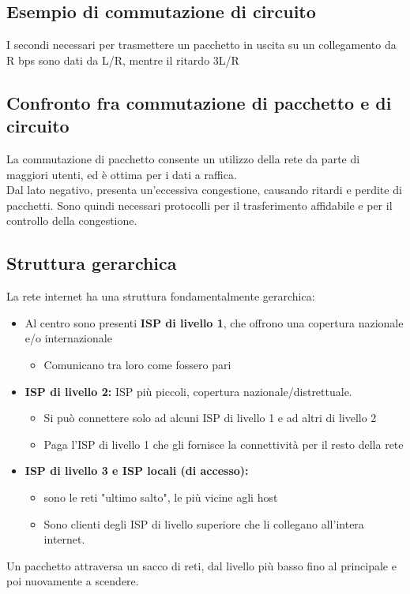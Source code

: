 \documentclass{report}
\begin{document}
	\subsection{Esempio di commutazione di circuito}
	I secondi necessari per trasmettere un pacchetto in uscita su un collegamento da R bps sono dati da L/R, mentre il ritardo 3L/R
	\subsection{Confronto fra commutazione di pacchetto e di circuito}
	La commutazione di pacchetto consente un utilizzo della rete da parte di maggiori utenti, ed è ottima per i dati a raffica.\medskip\\ Dal lato negativo, presenta un'eccessiva congestione, causando ritardi e perdite di pacchetti. Sono quindi necessari protocolli per il trasferimento affidabile e per il controllo della congestione.
	\subsection{Struttura gerarchica}
	La rete internet ha una struttura fondamentalmente gerarchica:
	\begin{itemize}
		\item Al centro sono presenti \textbf{ISP di livello 1}, che offrono una copertura nazionale e/o internazionale
		\begin{itemize}
			\item Comunicano tra loro come fossero pari
		\end{itemize}
		\item \textbf{ISP di livello 2:} ISP più piccoli, copertura nazionale/distrettuale.
		\begin{itemize}
			\item Si può connettere solo ad alcuni ISP di livello 1 e ad altri di livello 2
			\item Paga l'ISP di livello 1 che gli fornisce la connettività per il resto della rete
		\end{itemize}
		\item \textbf{ISP di livello 3 e ISP locali (di accesso):}
		\begin{itemize} 
			\item sono le reti "ultimo salto", le più vicine agli host
			\item Sono clienti degli ISP di livello superiore che li collegano all'intera internet.
		\end{itemize}
	\end{itemize}
	Un pacchetto attraversa un sacco di reti, dal livello più basso fino al principale e poi nuovamente a scendere.
\end{document}
